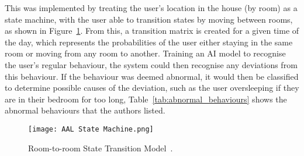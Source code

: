 This was implemented by treating the user's location in the house (by room) as a state machine, with the user able to transition states by moving between rooms, as shown in Figure~\ref{fig:state_machine}.
From this, a transition matrix is created for a given time of the day, which represents the probabilities of the user either staying in the same room or moving from any room to another.
Training an AI model to recognise the user's regular behaviour, the system could then recognise any deviations from this behaviour.
If the behaviour was deemed abnormal, it would then be classified to determine possible causes of the deviation, such as the user oversleeping if they are in their bedroom for too long, Table~\ref{tab:abnormal_behaviours} shows the abnormal behaviours that the authors listed.

\begin{figure}[!htb]
    \caption{Room-to-room State Transition Model~\protect\cite{Eisa17}.}
    \centering
    \texttt{[image: AAL State Machine.png]}
    \label{fig:state_machine}
\end{figure}

